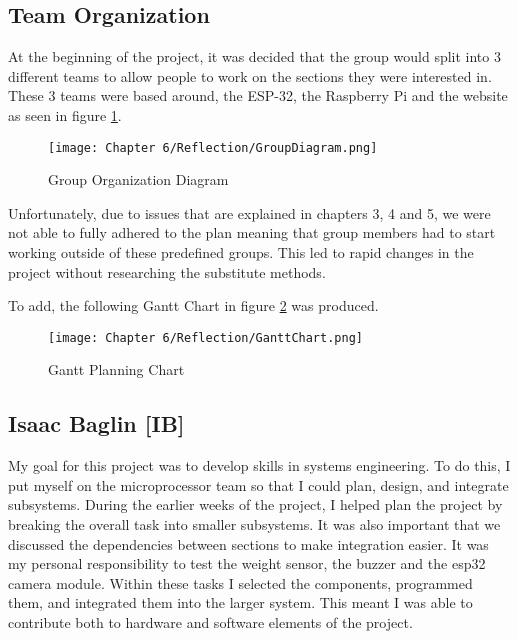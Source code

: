 \subsection{Team Organization}

At the beginning of the project, it was decided that the group would split into 3 different teams to allow people to work on the sections they were interested in.
These 3 teams were based around, the ESP-32, the Raspberry Pi and the website as seen in figure \ref{fig:grouporg}.

\begin{figure}[H]        
    \centering
    \texttt{[image: Chapter 6/Reflection/GroupDiagram.png]}
    \caption{Group Organization Diagram}
    \label{fig:grouporg}
\end{figure} 

Unfortunately, due to issues that are explained in chapters 3, 4 and 5,
we were not able to fully adhered to the plan meaning that group members had to start working outside of these predefined groups.
This led to rapid changes in the project without researching the substitute methods.

To add, the following Gantt Chart in figure \ref{fig:gantt} was produced.

\begin{figure}[H]        
    \centering
    \texttt{[image: Chapter 6/Reflection/GanttChart.png]}
    \caption{Gantt Planning Chart}
    \label{fig:gantt}
\end{figure} 

\subsection{Isaac Baglin [IB]}
My goal for this project was to develop skills in systems engineering.
To do this, I put myself on the microprocessor team so that I could plan, design, and integrate subsystems.
During the earlier weeks of the project, I helped plan the project by breaking the overall task into smaller subsystems.
It was also important that we discussed the dependencies between sections to make integration easier.
It was my personal responsibility to test the weight sensor, the buzzer and the esp32 camera module.
Within these tasks I selected the components, programmed them, and integrated them into the larger system.
This meant I was able to contribute both to hardware and software elements of the project.

